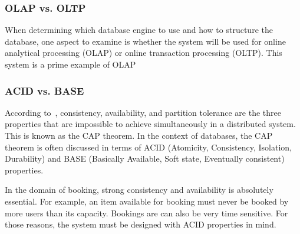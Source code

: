 \subsubsection{OLAP vs. OLTP}
\label{part:olap_vs_oltp}

When determining which database engine to use and how to structure the database, one aspect to examine is whether the system will be used for online analytical processing (OLAP) or online transaction processing (OLTP). This system is a prime example of OLAP

\subsubsection{ACID vs. BASE}
\label{part:acid_vs_base}

According to~\cite{brewer_cap, ibm_cap}, consistency, availability, and partition tolerance are the three properties that are impossible to achieve simultaneously in a distributed system. This is known as the CAP theorem. In the context of databases, the CAP theorem is often discussed in terms of ACID (Atomicity, Consistency, Isolation, Durability) and BASE (Basically Available, Soft state, Eventually consistent) properties.

In the domain of booking, strong consistency and availability is absolutely essential. For example, an item available for booking must never be booked by more users than its capacity. Bookings are can also be very time sensitive. For those reasons, the system must be designed with ACID properties in mind.
